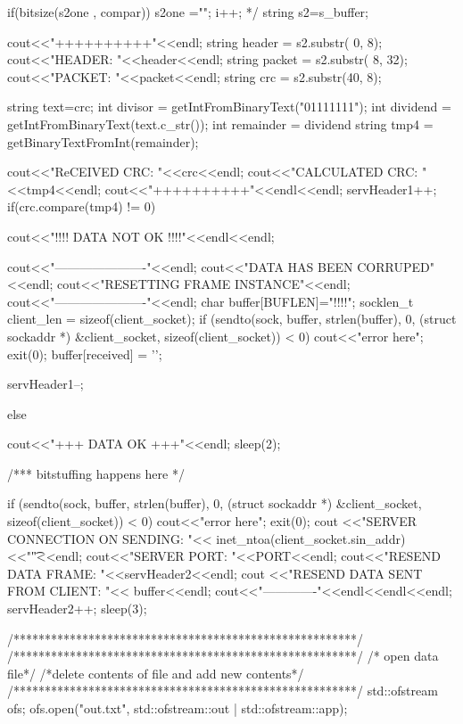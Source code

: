 \documentclass{article}
\begin{document}
\begin{titlepage}
{{{{  			
  				if(bitsize(s2one , compar))
  				{
  					s2one ="";
  					i++;
  				}
  			}*/
  			string s2=s_buffer;
			
			cout<<"++++++++++"<<endl;
			string header = s2.substr( 0, 8);
			cout<<"HEADER: "<<header<<endl;
			string packet = s2.substr( 8, 32);
			cout<<"PACKET: "<<packet<<endl;
			string crc = s2.substr(40, 8);
			
			string text=crc;
			int divisor = getIntFromBinaryText("01111111");
			int dividend = getIntFromBinaryText(text.c_str());
  			int remainder = dividend %
  			string tmp4 = getBinaryTextFromInt(remainder);
  			
  			
  			
  			
  			
  			cout<<"ReCEIVED CRC: "<<crc<<endl;
  			cout<<"CALCULATED CRC: "<<tmp4<<endl;
			cout<<"++++++++++"<<endl<<endl;
			servHeader1++;
			if(crc.compare(tmp4) != 0)
			{
				
				
				cout<<"!!!! DATA NOT  OK !!!!"<<endl<<endl;
			
				cout<<"----------------------"<<endl;
				cout<<"DATA HAS BEEN CORRUPED"<<endl;
				cout<<"RESETTING FRAME INSTANCE"<<endl;
				cout<<"----------------------"<<endl;
				char buffer[BUFLEN]="!!!!";
				socklen_t client_len = sizeof(client_socket);
				if (sendto(sock, buffer, strlen(buffer), 0, (struct sockaddr *) &client_socket, sizeof(client_socket)) < 0)
				{
					cout<<"error here";
					exit(0);
				}
				buffer[received] = '\0';
				
				servHeader1--;
			}
			else
			{
				cout<<"+++ DATA OK +++"<<endl;
				sleep(2);
				
				/***
				bitstuffing happens here
				*/

				if (sendto(sock, buffer, strlen(buffer), 0, (struct sockaddr *) &client_socket, sizeof(client_socket)) < 0)
				{
					cout<<"error here";
					exit(0);
				}
				cout <<"SERVER CONNECTION ON SENDING: "<< inet_ntoa(client_socket.sin_addr)<<"\t"<<endl;
				cout<<"SERVER PORT: "<<PORT<<endl;
				cout<<"RESEND DATA FRAME: "<<servHeader2<<endl;
				cout <<"RESEND DATA SENT FROM CLIENT: "<< buffer<<endl;
				cout<<"-------------"<<endl<<endl<<endl;
				servHeader2++;
				sleep(3);
				
	/*******************************************************/
	/*******************************************************/
		/* open data file*/
    		/*delete contents of file
    		and add new contents*/
    	/*******************************************************/
    				std::ofstream ofs;
				ofs.open("out.txt", std::ofstream::out | std::ofstream::app);
				 
}}}}
\end{titlepage}
\end{document}

